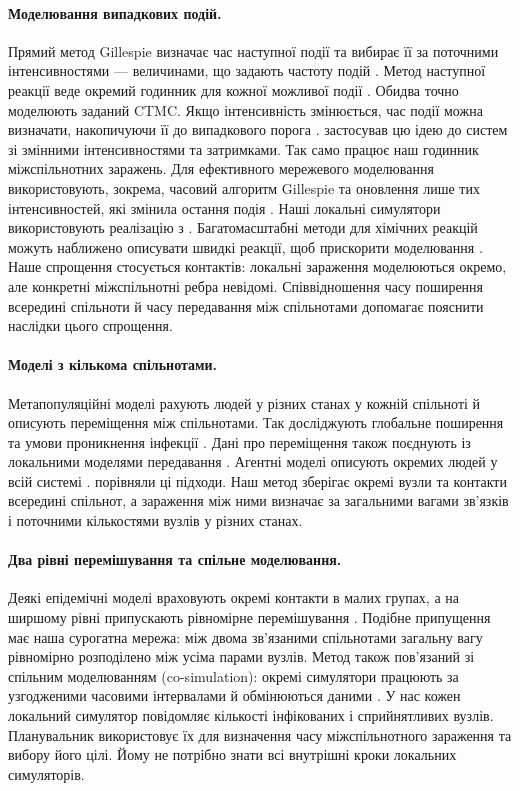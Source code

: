 \documentclass[11pt,a4paper]{article}
\begin{document}
\paragraph{Моделювання випадкових подій.}
Прямий метод Gillespie визначає час наступної події та вибирає її за поточними інтенсивностями --- величинами, що задають частоту подій \citep{gillespie1977exact}. Метод наступної реакції веде окремий годинник для кожної можливої події \citep{gibson2000}. Обидва точно моделюють заданий CTMC. Якщо інтенсивність змінюється, час події можна визначати, накопичуючи її до випадкового порога \citep{ethier1986}. \citet{anderson2007} застосував цю ідею до систем зі змінними інтенсивностями та затримками. Так само працює наш годинник міжспільнотних заражень. Для ефективного мережевого моделювання використовують, зокрема, часовий алгоритм Gillespie та оновлення лише тих інтенсивностей, які змінила остання подія \citep{vestergaard2015,kuryliak2025simulating}. Наші локальні симулятори використовують реалізацію з \citet{kuryliak2025simulating}.
Багатомасштабні методи для хімічних реакцій можуть наближено описувати швидкі реакції, щоб прискорити моделювання \citep{haseltine2002,cao2005slow}. Наше спрощення стосується контактів: локальні зараження моделюються окремо, але конкретні міжспільнотні ребра невідомі. Співвідношення часу поширення всередині спільноти й часу передавання між спільнотами допомагає пояснити наслідки цього спрощення.
\paragraph{Моделі з кількома спільнотами.}
Метапопуляційні моделі рахують людей у різних станах у кожній спільноті й описують переміщення між спільнотами. Так досліджують глобальне поширення та умови проникнення інфекції \citep{colizza2007reaction,colizza2008,balcan2009,balcan2010modeling}. Дані про переміщення також поєднують із локальними моделями передавання \citep{chang2021}. Агентні моделі описують окремих людей у всій системі \citep{eubank2004,kerr2021}. \citet{ajelli2010} порівняли ці підходи. Наш метод зберігає окремі вузли та контакти всередині спільнот, а зараження між ними визначає за загальними вагами зв'язків і поточними кількостями вузлів у різних станах.
\paragraph{Два рівні перемішування та спільне моделювання.}
Деякі епідемічні моделі враховують окремі контакти в малих групах, а на ширшому рівні припускають рівномірне перемішування \citep{ball1997}. Подібне припущення має наша сурогатна мережа: між двома зв'язаними спільнотами загальну вагу рівномірно розподілено між усіма парами вузлів.
Метод також пов'язаний зі спільним моделюванням (co-simulation): окремі симулятори працюють за узгодженими часовими інтервалами й обмінюються даними \citep{gomes2018cosim}. У нас кожен локальний симулятор повідомляє кількості інфікованих і сприйнятливих вузлів. Планувальник використовує їх для визначення часу міжспільнотного зараження та вибору його цілі. Йому не потрібно знати всі внутрішні кроки локальних симуляторів.
\clearpage
\end{document}
